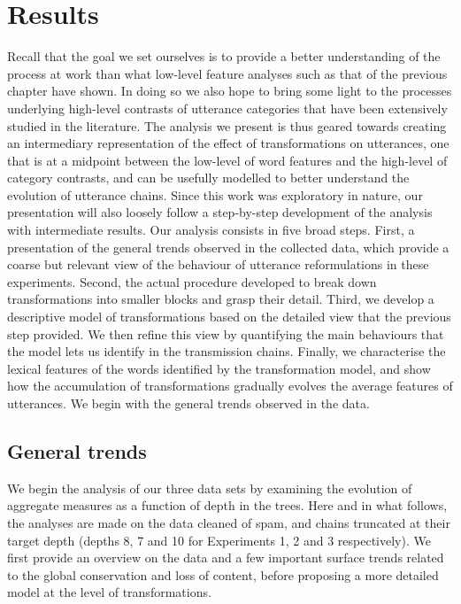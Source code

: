 \section{Results}\label{sec:gistr-results}

Recall that the goal we set ourselves is to provide a better
understanding of the process at work than what low-level feature
analyses such as that of the previous chapter have shown. In doing so we
also hope to bring some light to the processes underlying high-level
contrasts of utterance categories that have been extensively studied in
the literature. The analysis we present is thus geared towards creating
an intermediary representation of the effect of transformations on
utterances, one that is at a midpoint between the low-level of word
features and the high-level of category contrasts, and can be usefully
modelled to better understand the evolution of utterance chains. Since
this work was exploratory in nature, our presentation will also loosely
follow a step-by-step development of the analysis with intermediate
results. Our analysis consists in five broad steps. First, a
presentation of the general trends observed in the collected data, which
provide a coarse but relevant view of the behaviour of utterance
reformulations in these experiments. Second, the actual procedure
developed to break down transformations into smaller blocks and grasp
their detail. Third, we develop a descriptive model of transformations
based on the detailed view that the previous step provided. We then
refine this view by quantifying the main behaviours that the model lets
us identify in the transmission chains. Finally, we characterise the
lexical features of the words identified by the transformation model,
and show how the accumulation of transformations gradually evolves the
average features of utterances. We begin with the general trends
observed in the data.

\subsection{General trends}\label{sec:gistr-results-general}

We begin the analysis of our three data sets by examining the evolution
of aggregate measures as a function of depth in the trees. Here and in
what follows, the analyses are made on the data cleaned of spam, and
chains truncated at their target depth (depths 8, 7 and 10 for Experiments 1, 2 and 3 respectively). We first provide an overview on the data and a few important surface trends related to the global conservation and loss of content, before proposing a more detailed model at the level of transformations.

